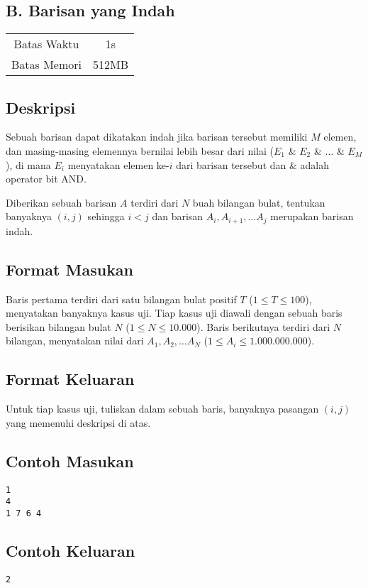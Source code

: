 \documentclass{article}
\begin{document}
\begin{center}
    \section*{B. Barisan yang Indah}

    \begin{tabular}{ | c c | }
        \hline
        Batas Waktu  & 1s \\
        Batas Memori & 512MB \\
        \hline
    \end{tabular}
\end{center}

\subsection*{Deskripsi}
Sebuah barisan dapat dikatakan indah jika barisan tersebut memiliki $M$ elemen, dan masing-masing elemennya bernilai lebih besar dari nilai ($E_1$ \& $E_2$ \& $\dots$ \& $E_M$), di mana $E_i$ menyatakan elemen ke-$i$ dari barisan tersebut dan \& adalah operator bit AND.

Diberikan sebuah barisan $A$ terdiri dari $N$ buah bilangan bulat, tentukan banyaknya $(i, j)$ sehingga $i < j$ dan barisan $A_i, A_{i+1}, \dots A_j$ merupakan barisan indah.

\subsection*{Format Masukan}
Baris pertama terdiri dari satu bilangan bulat positif $T$ ($1 \leq T \leq 100$), menyatakan banyaknya kasus uji.
Tiap kasus uji diawali dengan sebuah baris berisikan bilangan bulat $N$ ($1 \leq N \leq 10.000$).
Baris berikutnya terdiri dari $N$ bilangan, menyatakan nilai dari $A_1, A_2, \dots A_N$ ($1 \leq A_i \leq 1.000.000.000$).

\subsection*{Format Keluaran}
Untuk tiap kasus uji, tuliskan dalam sebuah baris, banyaknya pasangan $(i, j)$ yang memenuhi deskripsi di atas.
\\

\begin{multicols}{2}
\subsection*{Contoh Masukan}
\begin{lstlisting}
1
4
1 7 6 4
\end{lstlisting}
\columnbreak
\subsection*{Contoh Keluaran}
\begin{lstlisting}
2
\end{lstlisting}
\vfill
\null
\end{multicols}
\end{document}
